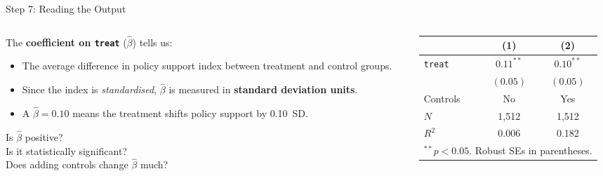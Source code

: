 \documentclass[aspectratio=169, 11pt]{beamer}
\begin{document}
\begin{frame}[t]{Step 7: Reading the Output}
\begin{columns}[T]
\begin{column}{0.54\textwidth}
The \textbf{coefficient on \texttt{treat}} ($\hat\beta$) tells us:
\begin{itemize}
  \setlength\itemsep{0.4em}
  \item The average difference in policy support index between treatment and control groups.
  \item Since the index is \emph{standardised}, $\hat\beta$ is measured in \textbf{standard deviation units}.
  \item A $\hat\beta = 0.10$ means the treatment shifts policy support by 0.10~SD.
\end{itemize}
\vspace{0.4em}
\begin{keybox}
Is $\hat\beta$ positive?\\
Is it statistically significant?\\
Does adding controls change $\hat\beta$ much?\\
\end{keybox}
\end{column}
\begin{column}{0.42\textwidth}
\begin{examplebox}
\small
\begin{tabular}{lcc}
\toprule
 & (1) & (2) \\
\midrule
\texttt{treat} & $0.11^{**}$ & $0.10^{**}$ \\
               & $(0.05)$    & $(0.05)$    \\
Controls       & No          & Yes         \\
$N$            & 1,512       & 1,512       \\
$R^2$          & 0.006       & 0.182       \\
\bottomrule
\multicolumn{3}{l}{\tiny $^{**}p<0.05$. Robust SEs in parentheses.}
\end{tabular}
\end{examplebox}
\vspace{0.3em}
\end{column}
\end{columns}
\end{frame}
\end{document}
